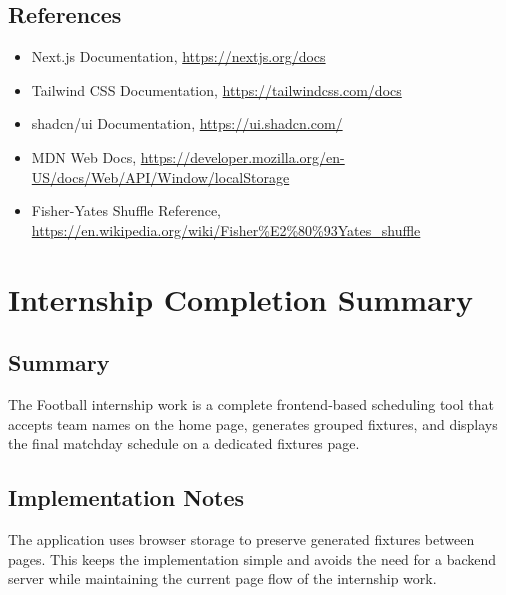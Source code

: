 \documentclass[12pt,a4paper]{report}
\begin{document}
\section{References}
\begin{itemize}
    \item Next.js Documentation, \url{https://nextjs.org/docs}
    \item Tailwind CSS Documentation, \url{https://tailwindcss.com/docs}
    \item shadcn/ui Documentation, \url{https://ui.shadcn.com/}
    \item MDN Web Docs, \url{https://developer.mozilla.org/en-US/docs/Web/API/Window/localStorage}
    \item Fisher-Yates Shuffle Reference, \url{https://en.wikipedia.org/wiki/Fisher%E2%80%93Yates_shuffle}
\end{itemize}


\chapter{Internship Completion Summary}

\section{Summary}
The Football  internship work is a complete frontend-based scheduling tool that accepts team names on the home page, generates grouped fixtures, and displays the final matchday schedule on a dedicated fixtures page.

\section{Implementation Notes}
The application uses browser storage to preserve generated fixtures between pages. This keeps the implementation simple and avoids the need for a backend server while maintaining the current page flow of the internship work.
\end{document}
